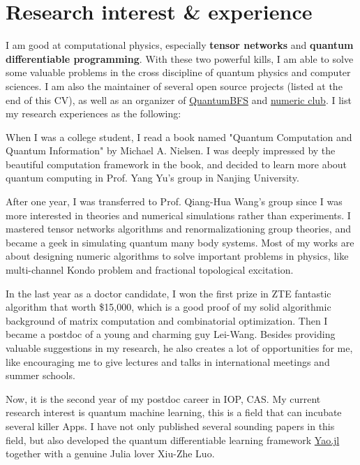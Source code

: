 \documentclass[letterpaper]{article}
\renewenvironment{itemize}{
  \begin{list}{}{
    \setlength{\leftmargin}{1.5em}
  }
}{
  \end{list}
}
\begin{document}
\section*{Research interest \& experience}
I am good at computational physics, especially \textbf{tensor networks} and \textbf{quantum differentiable programming}.
With these two powerful kills, I am able to solve some valuable problems in the cross discipline of quantum physics and computer sciences.
I am also the maintainer of several open source projects (listed at the end of this CV), as well as an organizer of \href{https://github.com/QuantumBFS/}{QuantumBFS} and \href{http://num.v2nobel.com}{numeric club}.
I list my research experiences as the following:
\begin{itemize}
    \item [1] When I was a college student, I read a book named "Quantum Computation and Quantum Information" by Michael A. Nielsen.
        I was deeply impressed by the beautiful computation framework in the book, and decided to learn more about quantum computing in Prof. Yang Yu's group in Nanjing University.
    \item [2] After one year, I was transferred to Prof. Qiang-Hua Wang's group since I was more interested in theories and numerical simulations rather than experiments. I mastered tensor networks algorithms and renormalizationing group theories, and became a geek in simulating quantum many body systems. Most of my works are about designing numeric algorithms to solve important problems in physics, like multi-channel Kondo problem and fractional topological excitation.
    \item [3] In the last year as a doctor candidate, I won the first prize in ZTE fantastic algorithm that worth \$15,000, which is a good proof of my solid algorithmic background of matrix computation and combinatorial optimization. Then I became a postdoc of a young and charming guy Lei-Wang. Besides providing valuable suggestions in my research, he also creates a lot of opportunities for me, like encouraging me to give lectures and talks in international meetings and summer schools.
    \item [4] Now, it is the second year of my postdoc career in IOP, CAS. My current research interest is quantum machine learning, this is a field that can incubate several killer Apps. I have not only published several sounding papers in this field, but also developed the quantum differentiable learning framework \href{https://github.com/QuantumBFS/Yao.jl}{Yao.jl} together with a genuine Julia lover Xiu-Zhe Luo.
\end{itemize}
\end{document}

